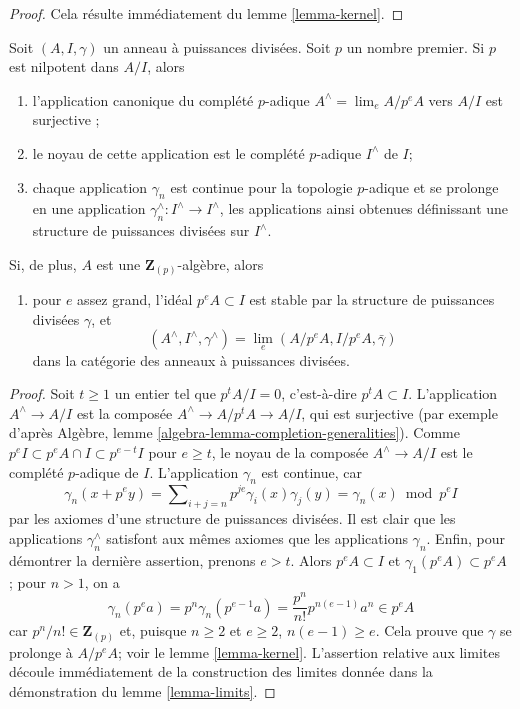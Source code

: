 \begin{proof}
Cela résulte immédiatement du lemme \ref{lemma-kernel}.
\end{proof}

\begin{lemma}
\label{lemma-extend-to-completion}
Soit $(A, I, \gamma)$ un anneau à puissances divisées. Soit $p$ un nombre
premier. Si $p$ est nilpotent dans $A/I$, alors
\begin{enumerate}
\item l'application canonique du complété $p$-adique $A^\wedge = \lim_e A/p^eA$ vers $A/I$ est surjective ;
\item le noyau de cette application est le complété $p$-adique $I^\wedge$ de $I$;
\item chaque application $\gamma_n$ est continue pour la topologie $p$-adique et se prolonge en une
application $\gamma_n^\wedge : I^\wedge\to I^\wedge$, les applications ainsi obtenues définissant une
structure de puissances divisées sur $I^\wedge$.
\end{enumerate}
Si, de plus, $A$ est une $\mathbf{Z}_{(p)}$-algèbre, alors
\begin{enumerate}
\item[(4)] pour $e$ assez grand, l'idéal $p^eA \subset I$ est stable par la
structure de puissances divisées $\gamma$, et
$$
(A^\wedge, I^\wedge, \gamma^\wedge) = \lim_e (A/p^eA, I/p^eA, \bar\gamma)
$$
dans la catégorie des anneaux à puissances divisées.
\end{enumerate}
\end{lemma}

\begin{proof}
Soit $t \geq 1$ un entier tel que $p^tA/I = 0$, c'est-à-dire $p^tA \subset I$.
L'application $A^\wedge\to A/I$ est la composée $A^\wedge\to A/p^tA \to A/I$,
qui est surjective (par exemple
d'après Algèbre, lemme \ref{algebra-lemma-completion-generalities}).
Comme $p^eI \subset p^eA \cap I \subset p^{e - t}I$ pour $e \geq t$,
le noyau de la composée $A^\wedge\to A/I$ est le complété $p$-adique
de $I$. L'application $\gamma_n$ est continue, car
$$
\gamma_n(x + p^ey) =
\sum\nolimits_{i + j = n} p^{je}\gamma_i(x)\gamma_j(y) =
\gamma_n(x) \bmod p^eI
$$
par les axiomes d'une structure de puissances
divisées. Il est clair que les applications $\gamma_n^\wedge$
satisfont aux mêmes axiomes que les applications $\gamma_n$. Enfin, pour démontrer la dernière assertion, prenons $e > t$.
Alors $p^eA \subset I$ et $\gamma_1(p^eA) \subset p^eA$ ; pour $n > 1$,
on a
$$
\gamma_n(p^ea) = p^n \gamma_n(p^{e - 1}a) = \frac{p^n}{n!} p^{n(e - 1)}a^n
\in p^e A
$$
car $p^n/n! \in\mathbf{Z}_{(p)}$ et, puisque $n \geq 2$ et $e \geq 2$,
$n(e - 1) \geq e$.
Cela prouve que $\gamma$ se prolonge à $A/p^eA$; voir le lemme \ref{lemma-kernel}.
L'assertion relative aux limites découle immédiatement de la construction des limites donnée dans
la démonstration du lemme \ref{lemma-limits}.
\end{proof}




